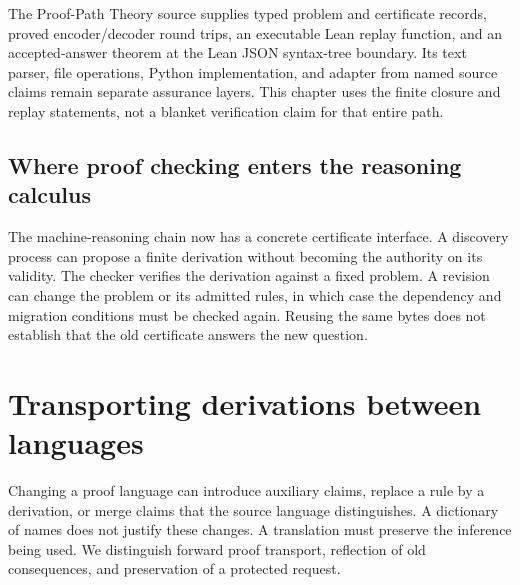 The Proof-Path Theory source supplies typed problem and certificate records, proved encoder/decoder round trips, an executable Lean replay function, and an accepted-answer theorem at the Lean JSON syntax-tree boundary. Its text parser, file operations, Python implementation, and adapter from named source claims remain separate assurance layers. This chapter uses the finite closure and replay statements, not a blanket verification claim for that entire path.


\section{Where proof checking enters the reasoning calculus}
The machine-reasoning chain now has a concrete certificate interface. A discovery process can propose a finite derivation without becoming the authority on its validity. The checker verifies the derivation against a fixed problem. A revision can change the problem or its admitted rules, in which case the dependency and migration conditions must be checked again. Reusing the same bytes does not establish that the old certificate answers the new question.


\chapter{Transporting derivations between languages}\label{Core:book:chapter-15}
\setcounter{section}{0}
Changing a proof language can introduce auxiliary claims, replace a rule by a derivation, or merge claims that the source language distinguishes. A dictionary of names does not justify these changes. A translation must preserve the inference being used. We distinguish forward proof transport, reflection of old consequences, and preservation of a protected request.

